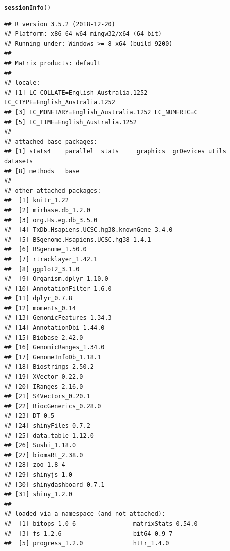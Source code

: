 \documentclass[12pt]{article}\usepackage[]{graphicx}\usepackage[]{color}
\makeatletter
\newcommand{\hlstd}[1]{\textcolor[rgb]{0.345,0.345,0.345}{#1}}%
\newcommand{\hlkwd}[1]{\textcolor[rgb]{0.737,0.353,0.396}{\textbf{#1}}}%
\newenvironment{kframe}{%
 \def\at@end@of@kframe{}%
 \ifinner\ifhmode%
  \def\at@end@of@kframe{\end{minipage}}%
  \begin{minipage}{\columnwidth}%
 \fi\fi%
 \def\FrameCommand##1{\hskip\@totalleftmargin \hskip-\fboxsep
 \colorbox{shadecolor}{##1}\hskip-\fboxsep
     \hskip-\linewidth \hskip-\@totalleftmargin \hskip\columnwidth}%
 \MakeFramed {\advance\hsize-\width
   \@totalleftmargin\z@ \linewidth\hsize
   \@setminipage}}%
 {\par\unskip\endMakeFramed%
 \at@end@of@kframe}
\newenvironment{knitrout}{}{} %
\makeatother
\begin{document}
\begin{knitrout}
\color{fgcolor}\begin{kframe}
\begin{alltt}
\hlkwd{sessionInfo}\hlstd{()}
\end{alltt}
\begin{verbatim}
## R version 3.5.2 (2018-12-20)
## Platform: x86_64-w64-mingw32/x64 (64-bit)
## Running under: Windows >= 8 x64 (build 9200)
## 
## Matrix products: default
## 
## locale:
## [1] LC_COLLATE=English_Australia.1252  LC_CTYPE=English_Australia.1252   
## [3] LC_MONETARY=English_Australia.1252 LC_NUMERIC=C                      
## [5] LC_TIME=English_Australia.1252    
## 
## attached base packages:
## [1] stats4    parallel  stats     graphics  grDevices utils     datasets 
## [8] methods   base     
## 
## other attached packages:
##  [1] knitr_1.22                             
##  [2] mirbase.db_1.2.0                       
##  [3] org.Hs.eg.db_3.5.0                     
##  [4] TxDb.Hsapiens.UCSC.hg38.knownGene_3.4.0
##  [5] BSgenome.Hsapiens.UCSC.hg38_1.4.1      
##  [6] BSgenome_1.50.0                        
##  [7] rtracklayer_1.42.1                     
##  [8] ggplot2_3.1.0                          
##  [9] Organism.dplyr_1.10.0                  
## [10] AnnotationFilter_1.6.0                 
## [11] dplyr_0.7.8                            
## [12] moments_0.14                           
## [13] GenomicFeatures_1.34.3                 
## [14] AnnotationDbi_1.44.0                   
## [15] Biobase_2.42.0                         
## [16] GenomicRanges_1.34.0                   
## [17] GenomeInfoDb_1.18.1                    
## [18] Biostrings_2.50.2                      
## [19] XVector_0.22.0                         
## [20] IRanges_2.16.0                         
## [21] S4Vectors_0.20.1                       
## [22] BiocGenerics_0.28.0                    
## [23] DT_0.5                                 
## [24] shinyFiles_0.7.2                       
## [25] data.table_1.12.0                      
## [26] Sushi_1.18.0                           
## [27] biomaRt_2.38.0                         
## [28] zoo_1.8-4                              
## [29] shinyjs_1.0                            
## [30] shinydashboard_0.7.1                   
## [31] shiny_1.2.0                            
## 
## loaded via a namespace (and not attached):
##  [1] bitops_1.0-6                matrixStats_0.54.0         
##  [3] fs_1.2.6                    bit64_0.9-7                
##  [5] progress_1.2.0              httr_1.4.0                 

\end{verbatim}
\end{kframe}
\end{knitrout}
\end{document}
